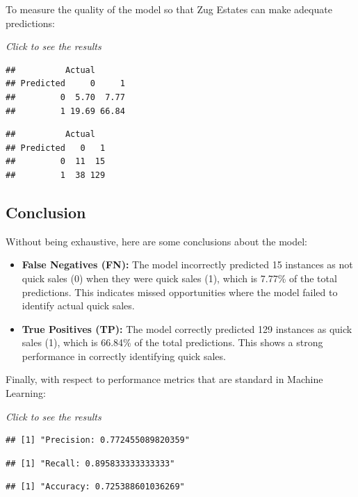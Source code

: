 \documentclass[
]{article}
\begin{document}
To measure the quality of the model so that Zug Estates can make
adequate predictions:

\emph{Click to see the results}

\begin{verbatim}
##          Actual
## Predicted     0     1
##         0  5.70  7.77
##         1 19.69 66.84
\end{verbatim}

\begin{verbatim}
##          Actual
## Predicted   0   1
##         0  11  15
##         1  38 129
\end{verbatim}

\subsection{Conclusion}\label{conclusion-1}

Without being exhaustive, here are some conclusions about the model:

\begin{itemize}
\item
  \textbf{False Negatives (FN):} The model incorrectly predicted 15
  instances as not quick sales (0) when they were quick sales (1), which
  is 7.77\% of the total predictions. This indicates missed
  opportunities where the model failed to identify actual quick sales.
\item
  \textbf{True Positives (TP):} The model correctly predicted 129
  instances as quick sales (1), which is 66.84\% of the total
  predictions. This shows a strong performance in correctly identifying
  quick sales.
\end{itemize}

Finally, with respect to performance metrics that are standard in
Machine Learning:

\emph{Click to see the results}

\begin{verbatim}
## [1] "Precision: 0.772455089820359"
\end{verbatim}

\begin{verbatim}
## [1] "Recall: 0.895833333333333"
\end{verbatim}

\begin{verbatim}
## [1] "Accuracy: 0.725388601036269"
\end{verbatim}
\end{document}
